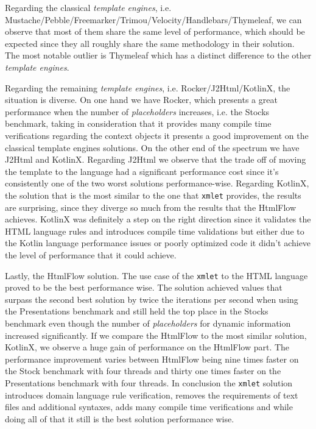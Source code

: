 \noindent
Regarding the classical \textit{template engines}, i.e. Mustache/Pebble/Freemarker/Trimou/Velocity/Handlebars/Thymeleaf, we can observe that most of them share the same level of performance, which should be expected since they all roughly share the same methodology in their solution. The most notable outlier is Thymeleaf which has a distinct difference to the other \textit{template engines}.

\noindent
Regarding the remaining \textit{template engines}, i.e. Rocker/J2Html/KotlinX, the situation is diverse. On one hand we have Rocker, which presents a great performance when the number of \textit{placeholders} increases, i.e. the Stocks benchmark, taking in consideration that it provides many compile time verifications regarding the context objects it presents a good improvement on the classical template engines solutions. On the other end of the spectrum we have J2Html and KotlinX. Regarding J2Html we observe that the trade off of moving the template to the language had a significant performance cost since it's consistently one of the two worst solutions performance-wise. Regarding KotlinX, the solution that is the most similar to the one that \texttt{xmlet} provides, the results are surprising, since they diverge so much from the results that the HtmlFlow achieves. KotlinX was definitely a step on the right direction since it validates the \ac{HTML} language rules and introduces compile time validations but either due to the Kotlin language performance issues or poorly optimized code it didn't achieve the level of performance that it could achieve.

\noindent
Lastly, the HtmlFlow solution. The use case of the \texttt{xmlet} to the \ac{HTML} language proved to be the best performance wise. The solution achieved values that surpass the second best solution by twice the iterations per second when using the Presentations benchmark and still held the top place in the Stocks benchmark even though the number of \textit{placeholders} for dynamic information increased significantly. If we compare the HtmlFlow to the most similar solution, KotlinX, we observe a huge gain of performance on the HtmlFlow part. The performance improvement varies between HtmlFlow being nine times faster on the Stock benchmark with four threads and thirty one times faster on the Presentations benchmark with four threads. In conclusion the \texttt{xmlet} solution introduces domain language rule verification, removes the requirements of text files and additional syntaxes, adds many compile time verifications and while doing all of that it still is the best solution performance wise.